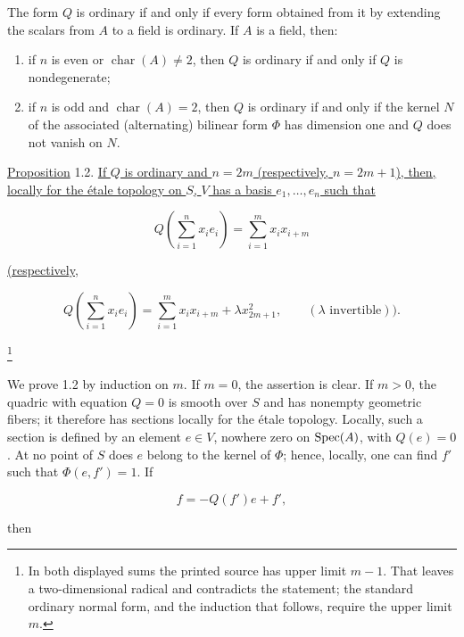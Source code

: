 The form $Q$ is ordinary if and only if every form obtained from it by
extending the scalars from $A$ to a field is ordinary.  If $A$ is a
field, then:

\begin{enumerate}[label=\alph*),leftmargin=2.5em]
\item if $n$ is even or $\operatorname{char}(A)\ne2$, then $Q$ is ordinary
if and only if $Q$ is nondegenerate;

\item if $n$ is odd and $\operatorname{char}(A)=2$, then $Q$ is ordinary
if and only if the kernel $N$ of the associated (alternating) bilinear
form $\Phi$ has dimension one and $Q$ does not vanish on $N$.
\end{enumerate}

\underline{Proposition} 1.2. \underline{If $Q$ is ordinary and
$n=2m$ (respectively, $n=2m+1$), then, locally for the étale topology on
$S$, $V$ has a basis $e_1,\ldots,e_n$ such that}


\begin{equation*}
Q\!\left(\sum_{i=1}^{n}x_i e_i\right)
=\sum_{i=1}^{m}x_i x_{i+m}
\end{equation*}

\noindent\underline{(respectively,}

\begin{equation*}
Q\!\left(\sum_{i=1}^{n}x_i e_i\right)
=\sum_{i=1}^{m}x_i x_{i+m}+\lambda x_{2m+1}^{2},
\qquad (\lambda\text{ invertible})).
\end{equation*}

\footnote{In both displayed sums the printed source has upper limit
$m-1$.  That leaves a two-dimensional radical and contradicts the
statement; the standard ordinary normal form, and the induction that
follows, require the upper limit $m$.}

We prove 1.2 by induction on $m$.  If $m=0$, the assertion is clear.  If
$m>0$, the quadric with equation $Q=0$ is smooth over $S$ and has
nonempty geometric fibers; it therefore has sections locally for the
étale topology.  Locally, such a section is defined by an element
$e\in V$, nowhere zero on $\operatorname{Spec}(A)$, with $Q(e)=0$.  At no point of $S$
does $e$ belong to the kernel of $\Phi$; hence, locally, one can find
$f'$ such that $\Phi(e,f')=1$.  If

\begin{equation*}
f=-Q(f')e+f',
\end{equation*}

then

